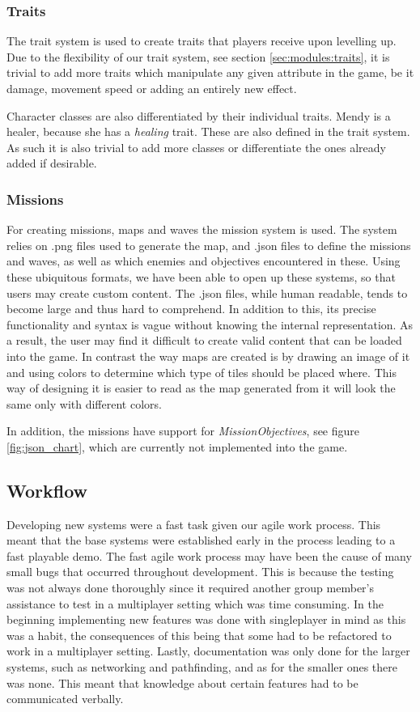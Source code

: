 \subsubsection{Traits}\label{dicsussion:traits}
The trait system is used to create traits that players receive upon levelling up.
Due to the flexibility of our trait system, see section \ref{sec:modules:traits}, it is trivial to add more traits which manipulate any given attribute in the game, be it damage, movement speed or adding an entirely new effect. 

Character classes are also differentiated by their individual traits.
Mendy is a healer, because she has a \emph{healing} trait.
These are also defined in the trait system.
As such it is also trivial to add more classes or differentiate the ones already added if desirable.

\subsubsection{Missions}\label{dicsussion:missions}
For creating missions, maps and waves the mission system is used.
The system relies on .png files used to generate the map, and .json files to define the missions and waves, as well as which enemies and objectives encountered in these.
Using these ubiquitous formats, we have been able to open up these systems, so that users may create custom content.
The .json files, while human readable, tends to become large and thus hard to comprehend.
In addition to this, its precise functionality and syntax is vague without knowing the internal representation.
As a result, the user may find it difficult to create valid content that can be loaded into the game.
In contrast the way maps are created is by drawing an image of it and using colors to determine which type of tiles should be placed where. This way of designing it is easier to read as the map generated from it will look the same only with different colors.

In addition, the missions have support for \textit{MissionObjectives}, see figure \ref{fig:json_chart}, which are currently not implemented into the game.

\subsection{Workflow}
Developing new systems were a fast task given our agile work process.
This meant that the base systems were established early in the process leading to a fast playable demo.
The fast agile work process may have been the cause of many small bugs that occurred throughout development.
This is because the testing was not always done thoroughly since it required another group member's assistance to test in a multiplayer setting which was time consuming.
In the beginning implementing new features was done with singleplayer in mind as this was a habit, the consequences of this being that some had to be refactored to work in a multiplayer setting.
Lastly, documentation was only done for the larger systems, such as networking and pathfinding, and as for the smaller ones there was none.
This meant that knowledge about certain features had to be communicated verbally.

